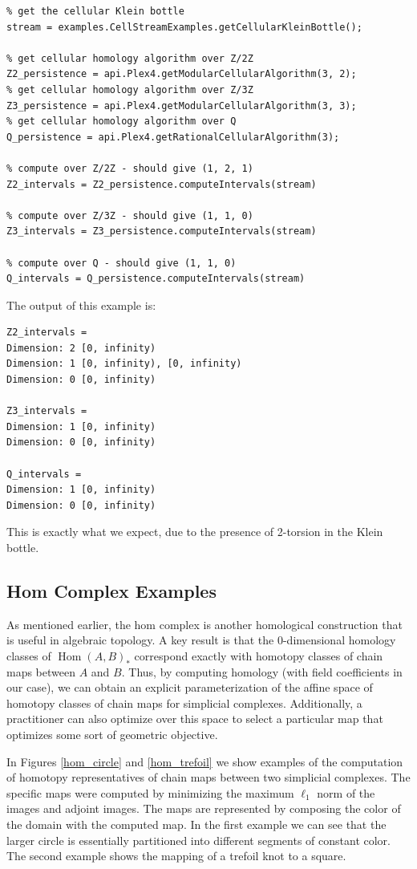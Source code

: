 \begin{verbatim}
% get the cellular Klein bottle
stream = examples.CellStreamExamples.getCellularKleinBottle();

% get cellular homology algorithm over Z/2Z
Z2_persistence = api.Plex4.getModularCellularAlgorithm(3, 2);
% get cellular homology algorithm over Z/3Z
Z3_persistence = api.Plex4.getModularCellularAlgorithm(3, 3);
% get cellular homology algorithm over Q
Q_persistence = api.Plex4.getRationalCellularAlgorithm(3);

% compute over Z/2Z - should give (1, 2, 1)
Z2_intervals = Z2_persistence.computeIntervals(stream)

% compute over Z/3Z - should give (1, 1, 0)
Z3_intervals = Z3_persistence.computeIntervals(stream)

% compute over Q - should give (1, 1, 0)
Q_intervals = Q_persistence.computeIntervals(stream)
\end{verbatim}
The output of this example is:
\begin{verbatim}
Z2_intervals =
Dimension: 2 [0, infinity)
Dimension: 1 [0, infinity), [0, infinity)
Dimension: 0 [0, infinity)
  
Z3_intervals =
Dimension: 1 [0, infinity)
Dimension: 0 [0, infinity)
 
Q_intervals =
Dimension: 1 [0, infinity)
Dimension: 0 [0, infinity)
\end{verbatim}
This is exactly what we expect, due to the presence of 2-torsion in the Klein bottle.

\subsection{Hom Complex Examples}

As mentioned earlier, the hom complex is another homological construction that is useful in algebraic topology. A key result is that the 0-dimensional homology classes of $\mathop{\mathrm{Hom}}(A,B)_*$ correspond exactly with homotopy classes of chain maps between $A$ and $B$. Thus, by computing homology (with field coefficients in our case), we can obtain an explicit parameterization of the affine space of homotopy classes of chain maps for simplicial complexes. Additionally, a practitioner can also optimize over this space to select a particular map that optimizes some sort of geometric objective.

In Figures \ref{hom_circle} and \ref{hom_trefoil} we show examples of the computation of homotopy representatives of chain maps between two simplicial complexes. The specific maps were computed by minimizing the maximum $\ell_1$ norm of the images and adjoint images. The maps are represented by composing the color of the domain with the computed map. In the first example we can see that the larger circle is essentially partitioned into different segments of constant color. The second example shows the mapping of a trefoil knot to a square.

